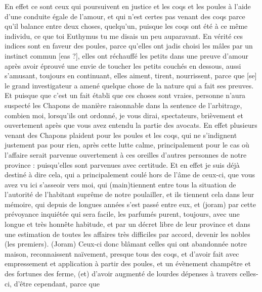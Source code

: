 \documentclass[12pt]{book}
\begin{document}
\begin{pages}
\begin{Rightside}
                        En effet ce sont ceux qui poursuivent en justice et les coqs et les poules à l’aide d’une conduite égale de l’amour, et qui n’est certes pas venant des coqs parce qu’il balance entre deux choses, quelqu’un, puisque les coqs ont été à ce même individu, ce que toi Euthymus tu me disais un peu auparavant.
                        En vérité ces indices sont en faveur des poules, parce qu’elles ont jadis choisi les mâles par un instinct commun [eas ?], elles ont réchauffé les petits dans une preuve d’amour après avoir éprouvé une envie de toucher les petits couchés en dessous, aussi s’amusant, toujours en continuant, elles aiment, tirent, nourrissent, parce que [se] le grand investigateur a amené quelque chose de la nature qui a fait ses preuves.
                        Et puisque que c’est un fait établi que ces choses sont vraies, personne n’aura suspecté les Chapons de manière raisonnable dans la sentence de l’arbitrage, combien moi, lorsqu’ils ont ordonné, je vous dirai, spectateurs, brièvement et ouvertement après que vous avez entendu la partie des avocats.
                        En effet plusieurs venant des Chapons plaident pour les poules et les coqs, qui ne s’indignent justement pas pour rien, après cette lutte calme, principalement pour le cas où l’affaire serait parvenue ouvertement à ces oreilles d’autres personnes de notre province : puisqu’elles sont parvenues avec certitude.
                        Et en effet je suis déjà destiné à dire cela, qui a principalement coulé hors de l’âme de ceux-ci, que vous avez vu ici s’asseoir vers moi, qui (main)tiennent entre tous la situation de l’autorité de l’habitant suprême de notre poulailler, et ils tiennent cela dans leur mémoire, qui depuis de longues années s’est passé entre eux, et (joram) par cette prévoyance inquiétée qui sera facile, les parfumés purent, toujours, avec une longue et très honnête habitude, et par un décret libre de leur province et dans une estimation de toutes les affaires très difficiles par accord, devenir les nobles (les premiers). 
                        (Joram) Ceux-ci donc blâmant celles qui ont abandonnée notre maison, reconnaissent naïvement, presque tous des coqs, et d’avoir fait avec empressement et application à partir des poules, et un évènement champêtre et des fortunes des ferme, (et) d’avoir augmenté de lourdes dépenses à travers celles-ci, d’être cependant, parce que
                        
                    \pend
        \endnumbering
        \end{Rightside}
        \end{pages}
        \Pages
        
\end{document}
